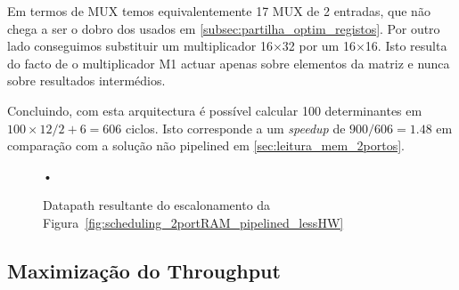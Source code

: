 \documentclass[a4paper]{article}
\begin{document}
Em termos de MUX temos equivalentemente 17 MUX de 2 entradas, que não chega a ser o dobro dos usados em \ref{subsec:partilha_optim_registos}. Por outro lado conseguimos substituir um multiplicador 16$\times$32 por um 16$\times$16. Isto resulta do facto de o multiplicador M1 actuar apenas sobre elementos da matriz e nunca sobre resultados intermédios.

Concluindo, com esta arquitectura é possível calcular 100 determinantes em $ 100 \times 12/2 + 6 = 606 $ ciclos. Isto corresponde a um \textit{speedup} de $ 900/606 = 1.48 $ em comparação com a solução não pipelined em \ref{sec:leitura_mem_2portos}.

\begin{figure}[h]
\centering
•
\caption{Datapath resultante do escalonamento da Figura~\ref{fig:scheduling_2portRAM_pipelined_lessHW}}
\label{fig:datapath_pipelined_lessHW}
\end{figure}

\pagebreak
\subsection{Maximização do Throughput}
\label{subsec:arqui_2portRAM_maxthroughput}

\end{document}
